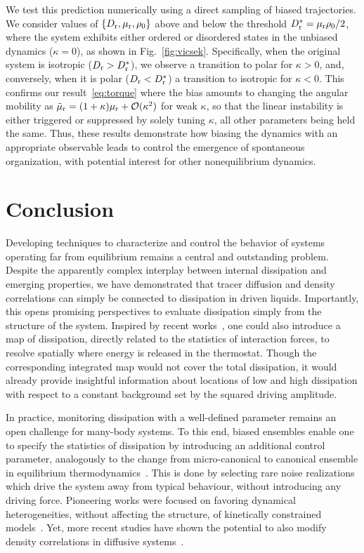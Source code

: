 \documentclass[superscriptaddress, twocolumn, prx, longbibliography, nofootinbib]{revtex4-1}
\begin{document}
We test this prediction numerically using a direct sampling of biased trajectories. We consider values of $\{D_{\rm r},\mu_{\rm r},\rho_0\}$ above and below the threshold $D_{\rm r}^*=\mu_{\rm r}\rho_0/2$, where the system exhibits either ordered or disordered states in the unbiased dynamics ($\kappa=0$), as shown in Fig.~\ref{fig:vicsek}. Specifically, when the original system is isotropic ($D_{\rm r}>D_{\rm r}^*$), we observe a transition to polar for $\kappa>0$, and, conversely, when it is polar ($D_{\rm r}<D_{\rm r}^*$) a transition to isotropic for $\kappa<0$. This confirms our result~\eqref{eq:torque} where the bias amounts to changing the angular mobility as $\tilde\mu_{\rm r}=(1+\kappa)\mu_{\rm r} + {\cal O}(\kappa^2)$ for weak $\kappa$, so that the linear instability is either triggered or suppressed by solely tuning $\kappa$, all other parameters being held the same. Thus, these results demonstrate how biasing the dynamics with an appropriate observable leads to control the emergence of spontaneous organization, with potential interest for other nonequilibrium dynamics.




\section{Conclusion}

Developing techniques to characterize and control the behavior of systems operating far from equilibrium remains a central and outstanding problem. Despite the apparently complex interplay between internal dissipation and emerging properties, we have demonstrated that tracer diffusion and density correlations can simply be connected to dissipation in driven liquids. Importantly, this opens promising perspectives to evaluate dissipation simply from the structure of the system. Inspired by recent works~\cite{Nardini2017, Spinney2018}, one could also introduce a map of dissipation, directly related to the statistics of interaction forces, to resolve spatially where energy is released in the thermostat. Though the corresponding integrated map would not cover the total dissipation, it would already provide insightful information about locations of low and high dissipation with respect to a constant background set by the squared driving amplitude.


In practice, monitoring dissipation with a well-defined parameter remains an open challenge for many-body systems. To this end, biased ensembles enable one to specify the statistics of dissipation by introducing an additional control parameter, analogously to the change from micro-canonical to canonical ensemble in equilibrium thermodynamics~\cite{Chetrite2013, Jack2010}. This is done by selecting rare noise realizations which drive the system away from typical behaviour, without introducing any driving force. Pioneering works were focused on favoring dynamical heterogeneities, without affecting the structure, of kinetically constrained models~\cite{garrahan2007, Hedges2009, Pitard2011, Speck2012, Bodineau2012a}. Yet, more recent studies have shown the potential to also modify density correlations in diffusive systems~\cite{Jack2014, Cagnetta2017, Nemoto2019}.
\end{document}
